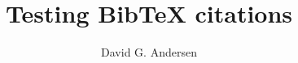\documentclass[10pt,twocolumn]{article}
\title{\sffamily\fontsize{18}{18}
\textbf{Testing BibTeX citations}}
\author{\large David G. Andersen}
\begin{document}
\maketitle

\begin{sloppypar}



\begin{small}


\end{small}


\end{sloppypar}
\end{document}
